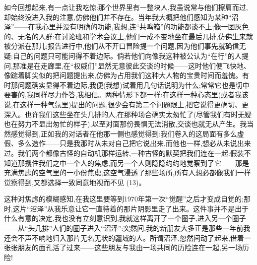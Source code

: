 如今回想起来,有一点让我吃惊:那个世界里有一整块人,我虽说常与他们擦肩而过,却始终没进入我的注意,仿佛他们并不存在。当年我大概把他们感知为某种“沼泽”——在我心里并没有明确的功能,我想,连“共鸣箱”的功能都谈不上;像一团灰色的、无名的人群:在讨论班和学术会议上,他们一成不变地坐在最后几排,仿佛生来就被分派在那儿;报告进行中,他们从不开口冒险提一个问题,因为他们事先就确信无疑:自己的问题只可能问得不着边际。倘若他们向像我这种被公认为“在行”的人提问,那准是在走廊里,在“权威们”显然无意彼此交谈的时候——这时他们便飞快地、像踮着脚尖似的把问题提出来,仿佛为占用我们这种大人物的宝贵时间而羞愧。有时那问题确实显得不着边际,我便(我想)试着用几句话说明为什么;常常它也是切中要害的,我同样尽力作答,我相信。两种情形下都一样:在这样一种心态里(或者我该说,在这样一种气氛里)提出的问题,很少会有第二个问题跟上,把它说得更确切、更深入。也许我们这些坐在头几排的人,在那种场合确实太匆忙了(尽管我们有时无疑也在努力不显出匆忙的样子),以至对面那份畏惧无法消散,交谈也就无从产生。我当然感觉得到,正如我的对话者在他那一侧也感觉得到:我们卷入的这局面有多么虚假、多么造作——只是我那时从未对自己把它说出来,而他也一样,想必从未说出来过。我们两个都像古怪的自动机那样运转,一种古怪的默契把我们连在一起:假装不知道那攫住我们之中一个人的焦虑,而另一个人则隐隐约约地觉察到了它——那是充满焦虑的空气里的一小份焦虑,这空气浸透了那些场所,所有人想必都像我们一样觉察得到,又都选择一致同意地视而不见 (13)。

这种对焦虑的模糊感知,在我这里要等到1970年第一次“觉醒”之后才变成自觉的;那时,这片“沼泽”从我乐意让它一直待着的那片阴影里走了出来。这件事并不是出于什么有意的决定,我也没有立刻意识到,我就这样离开了一个圈子,进入另一个圈子——从“头几排”人们的圈子进入“沼泽”:突然间,我的新朋友大多正是那些一年前我还会不声不响地归入那片无名无状的疆域的人。所谓沼泽,忽然间动了起来,借着一张张朋友的面孔活了过来——这些朋友与我由一场共同的历险连在一起,另一场历险!

